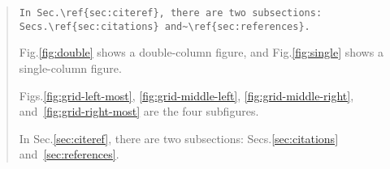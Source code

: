 \begin{enumerate}
\begin{quote}
\begin{scriptsize}
\begin{verbatim}
In Sec.\ref{sec:citeref}, there are two subsections:
Secs.\ref{sec:citations} and~\ref{sec:references}.
    \end{verbatim}
    Fig.\ref{fig:double} shows a double-column figure, and Fig.\ref{fig:single} shows a single-column figure.

    Figs.\ref{fig:grid-left-most}, \ref{fig:grid-middle-left}, \ref{fig:grid-middle-right}, and~\ref{fig:grid-right-most} are the four subfigures.

    In Sec.\ref{sec:citeref}, there are two subsections: Secs.\ref{sec:citations} and~\ref{sec:references}.
  \end{scriptsize}\end{quote}

\end{enumerate}
